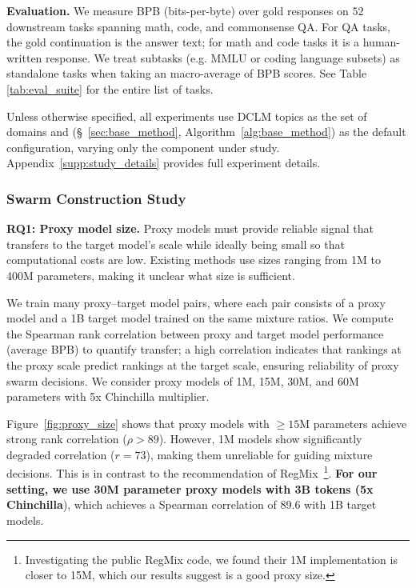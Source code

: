 \textbf{Evaluation.} We measure BPB (bits-per-byte) over gold responses on $52$ downstream tasks spanning math, code, and commonsense QA. 
For QA tasks, the gold continuation is the answer text; for math and code tasks it is a human-written response. 
We treat subtasks (e.g. MMLU or coding language subsets) as standalone tasks when taking an macro-average of BPB scores. See Table \ref{tab:eval_suite} for the entire list of tasks.

Unless otherwise specified, all experiments use DCLM topics as the set of domains and \base (\S~\ref{sec:base_method}, Algorithm~\ref{alg:base_method}) as the default configuration, varying only the component under study. Appendix~\ref{supp:study_details} provides full experiment details.

\subsubsection{Swarm Construction Study}\label{sec:swarm}

\textbf{RQ1: Proxy model size.} 
Proxy models must provide reliable signal that transfers to the target model's scale while ideally being small so that computational costs are low. Existing methods use sizes ranging from 1M to 400M parameters, making it unclear what size is sufficient.

We train many proxy–target model pairs, where each pair consists of a proxy model and a 1B target model trained on the same mixture ratios.
We compute the Spearman rank correlation between proxy and target model performance (average BPB) to quantify transfer; a high correlation indicates that rankings at the proxy scale predict rankings at the target scale, ensuring reliability of proxy swarm decisions. We consider proxy models of 1M, 15M, 30M, and 60M parameters with 5x Chinchilla multiplier.


Figure~\ref{fig:proxy_size} shows that proxy models with $\ge 15$M parameters achieve strong rank correlation ($\rho > 89$).
However, 1M models show significantly degraded correlation ($r = 73$), making them unreliable for guiding mixture decisions. This is in contrast to the recommendation of RegMix~\citep{liu2025regmixdatamixtureregression}\footnote{Investigating the public RegMix code, we found their 1M implementation is closer to 15M, which our results suggest is a good proxy size.}.
\textbf{For our setting, we use 30M parameter proxy models with 3B tokens (5x Chinchilla}), which achieves a Spearman correlation of 89.6 with 1B target models.


